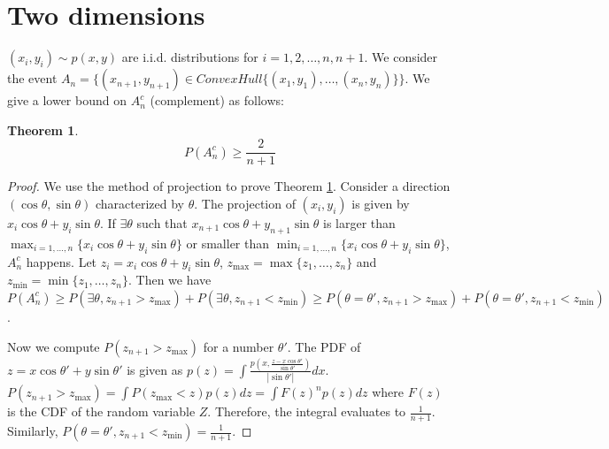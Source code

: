 \documentclass{article}
\newtheorem{theorem}{Theorem}
\begin{document}
\section{Two dimensions}
$(x_i, y_i) \sim p(x,y)$ are i.i.d. distributions
for $i=1,2,\dots, n, n+1$. We consider the event
$A_n =\{(x_{n+1}, y_{n+1}) \in ConvexHull\{(x_1, y_1),
\dots, (x_n, y_n)\} \}$. We give a lower bound on $A_n^c$
(complement) as follows:
\begin{theorem}\label{thm:lower_bound}
    \begin{equation}
        P(A_n^c) \geq \frac{2}{n+1}
    \end{equation}
\end{theorem}
\begin{proof}
We use the method of projection to prove Theorem
\ref{thm:lower_bound}.
Consider a direction $(\cos\theta, \sin \theta)$
characterized by $\theta$. The projection of $(x_i, y_i)$
is given by $x_i \cos\theta + y_i \sin \theta$.
If $\exists \theta$ such that
$x_{n+1}\cos\theta + y_{n+1} \sin \theta$
is larger than $\max_{i=1,\dots, n} \{x_{i}\cos\theta +
y_{i} \sin \theta\}$ or smaller than
$\min_{i=1,\dots, n} \{x_{i}\cos\theta +
y_{i} \sin \theta\}$, $A_n^c$ happens.
Let $z_i = x_i \cos \theta + y_i \sin \theta$,
$z_{\max}=\max\{z_1, \dots, z_n\}$ and
$z_{\min}=\min\{z_1, \dots, z_n\}$.
Then we have $P(A_n^c) \geq P(\exists \theta, z_{n+1} > z_{\max})
+ P(\exists \theta, z_{n+1} < z_{\min})
\geq P(\theta=\theta', z_{n+1} > z_{\max})
+ P(\theta=\theta', z_{n+1} < z_{\min}) $.

Now we compute $P(z_{n+1} > z_{\max})$
for a number $\theta'$.
The PDF of $z=x\cos \theta' + y \sin \theta'$
is given as $p(z)=\int
\frac{p(x, \frac{z-x \cos \theta'}
{\sin \theta'})}{|\sin \theta'|}dx$.
$P(z_{n+1} > z_{\max}) = \int P(z_{\max} < z)p(z)dz
= \int F(z)^n p(z)dz$ where $F(z)$ is the CDF of the
random variable $Z$. Therefore, the integral evaluates
to $\frac{1}{n+1}$. Similarly,
$P(\theta=\theta', z_{n+1} < z_{\min})=
\frac{1}{n+1}$.
\end{proof}
\end{document}

